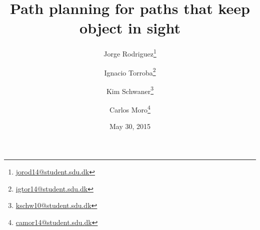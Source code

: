 
\title{Path planning for paths that keep object in sight}
\date{May 30, 2015}
\author{Jorge Rodriguez\thanks{\href{mailto:jorod14@student.sdu.dk}{jorod14@student.sdu.dk}}}
\author{Ignacio Torroba\thanks{\href{mailto:igtor14@student.sdu.dk}{igtor14@student.sdu.dk}}}
\author{Kim Schwaner\thanks{\href{mailto:kschw10@student.sdu.dk}{kschw10@student.sdu.dk}}}
\author{Carlos Moro\thanks{\href{mailto:camor14@student.sdu.dk}{camor14@student.sdu.dk}}}
